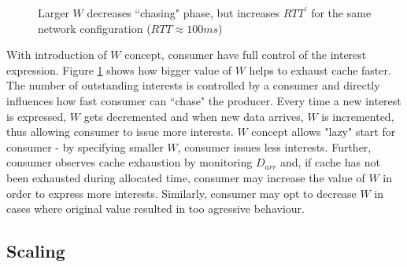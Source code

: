 \documentclass{icn/sig-alternate-2012} %
\begin{document}
\begin{figure}[t!]
\centering
\begin{scriptsize}
\end{scriptsize}
\caption{Larger $W$ decreases ``chasing" phase, but increases $RTT^\prime$ for the same network configuration ($RTT\approx100ms$)}
\label{fig:ws}
\end{figure}

With introduction of $W$ concept, consumer have full control of the interest expression. Figure \ref{fig:ws} shows how bigger value of $W$ helps to exhaust cache faster. The number of outstanding interests is controlled by a consumer and directly influences how fast consumer can ``chase" the producer. Every time a new interest is expressed, $W$ gets decremented and when new data arrives, $W$ is incremented, thus allowing consumer to issue more interests. $W$ concept allows "lazy" start for consumer - by specifying smaller $W$, consumer issues less interests. Further, consumer observes cache exhaustion by monitoring $D_{arr}$ and, if cache has not been exhausted during allocated time, consumer may increase the value of $W$ in order to express more interests. Similarly, consumer may opt to decrease $W$ in cases where original value resulted in too agressive behaviour.






\subsection{Scaling}
\end{document}
